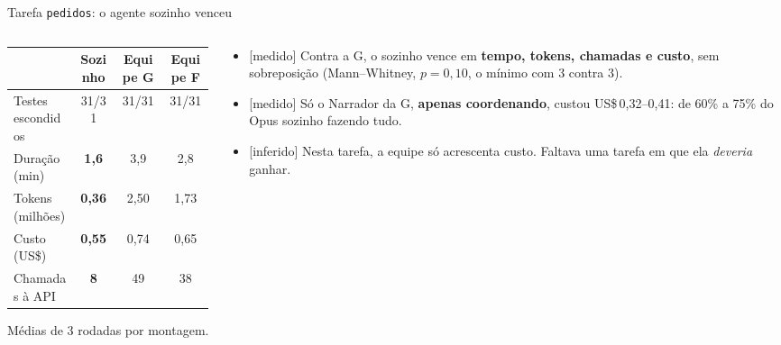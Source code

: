 \documentclass[11pt,aspectratio=169]{beamer}
\newcommand{\ev}[2]{{\scriptsize\sffamily\colorbox{#1!12}{\textcolor{#1!80!black}{[#2]}}}}
\newcommand{\medido}{\ev{ok}{medido}}
\newcommand{\inferido}{\ev{alerta}{inferido}}
\begin{document}
\begin{frame}{Tarefa \texttt{pedidos}: o agente sozinho venceu}
\begin{columns}[T]
\begin{column}{0.52\linewidth}
\small
\begin{tabular}{@{}l c c c@{}}
\toprule
& \textbf{Sozinho} & Equipe G & Equipe F \\
\midrule
Testes escondidos & 31/31 & 31/31 & 31/31 \\
Duração (min) & \textbf{1,6} & 3,9 & 2,8 \\
Tokens (milhões) & \textbf{0,36} & 2,50 & 1,73 \\
Custo (US\$) & \textbf{0,55} & 0,74 & 0,65 \\
Chamadas à API & \textbf{8} & 49 & 38 \\
\bottomrule
\end{tabular}
\vspace{0.3em}

{\scriptsize Médias de 3 rodadas por montagem.}
\end{column}
\begin{column}{0.45\linewidth}
\small
\begin{itemize}\setlength\itemsep{0.45em}
\item \medido{} Contra a G, o sozinho vence em \textbf{tempo, tokens, chamadas e custo}, sem sobreposição
  (Mann--Whitney, $p = 0{,}10$, o mínimo com 3 contra 3).
\item \medido{} Só o Narrador da G, \textbf{apenas coordenando}, custou US\$\,0,32--0,41: de 60\% a 75\% do Opus
  sozinho fazendo tudo.
\item \inferido{} Nesta tarefa, a equipe só acrescenta custo. Faltava uma tarefa em que ela \emph{deveria}
  ganhar.
\end{itemize}
\end{column}
\end{columns}
\end{frame}
\end{document}
